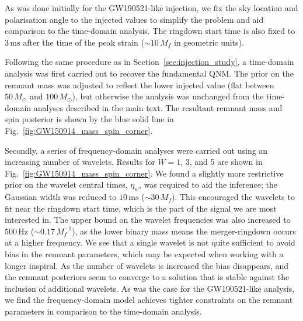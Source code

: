 As was done initially for the GW190521-like injection, we fix the sky location and polarisation angle to the injected values to simplify the problem and aid comparison to the time-domain analysis.
The ringdown start time is also fixed to $3\,\mathrm{ms}$ after the time of the peak strain ($\sim 10\,M_f$ in geometric units).

Following the same procedure as in Section~\ref{sec:injection_study}, a time-domain analysis was first carried out to recover the fundamental QNM. 
The prior on the remnant mass was adjusted to reflect the lower injected value (flat between $50\,M_\odot$ and $100\,M_\odot$), but otherwise the analysis was unchanged from the time-domain analyses described in the main text.
The resultant remnant mass and spin posterior is shown by the blue solid line in Fig.~\ref{fig:GW150914_mass_spin_corner}.

Secondly, a series of frequency-domain analyses were carried out using an increasing number of wavelets.
Results for $W=1$, 3, and 5 are shown in Fig.~\ref{fig:GW150914_mass_spin_corner}.
We found a slightly more restrictive prior on the wavelet central times, $\eta_w$, was required to aid the inference; the Gaussian width was reduced to $10\,\mathrm{ms}$ ($\sim 30\,M_f$).
This encouraged the wavelets to fit near the ringdown start time, which is the part of the signal we are most interested in.
The upper bound on the wavelet frequencies was also increased to $500\,\mathrm{Hz}$ ($\sim 0.17\,M_f^{-1}$), as the lower binary mass means the merger-ringdown occurs at a higher frequency.
We see that a single wavelet is not quite sufficient to avoid bias in the remnant parameters, which may be expected when working with a longer inspiral.
As the number of wavelets is increased the bias disappears, and the remnant posteriors seem to converge to a solution that is stable against the inclusion of additional wavelets. 
As was the case for the GW190521-like analysis, we find the frequency-domain model achieves tighter constraints on the remnant parameters in comparison to the time-domain analysis. 

